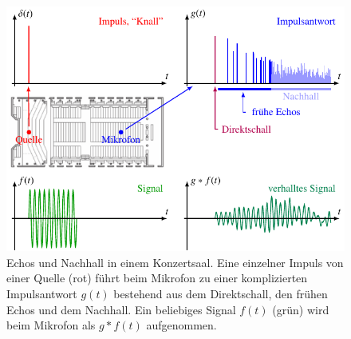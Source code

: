 %
%
%
\begin{figure}
\centering
\includegraphics{chapters/030-gruppen/images/konzertsaal.pdf}
\caption{Echos und Nachhall in einem Konzertsaal.
Eine einzelner Impuls von einer Quelle (rot) führt beim Mikrofon
zu einer komplizierten Impulsantwort $g(t)$ bestehend aus
dem Direktschall, den frühen Echos und dem Nachhall.
Ein beliebiges Signal $f(t)$ (grün) wird beim Mikrofon als $g*f(t)$
aufgenommen.
\label{buch:gruppen:faltung:fig:konzertsaal}}
\end{figure}
